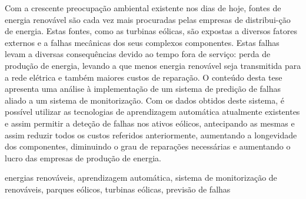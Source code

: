 


Com a crescente preocupação ambiental existente nos dias de hoje, fontes de energia renovável são cada vez mais procuradas pelas empresas de distribui-ção de energia. Estas fontes, como as turbinas eólicas, são expostas a diversos fatores externos e a falhas mecânicas dos seus complexos componentes. Estas falhas levam a diversas consequências devido ao tempo fora de serviço: perda de produção de energia, levando a que menos energia renovável seja transmitida para a rede elétrica e também maiores custos de reparação. O conteúdo desta tese apresenta uma análise à implementação de um sistema de predição de falhas aliado a um sistema de monitorização. Com os dados obtidos deste sistema, é possível utilizar as tecnologias de aprendizagem automática atualmente existentes e assim permitir a deteção de falhas nos ativos eólicos, antecipando as mesmas e assim reduzir todos os custos referidos anteriormente, aumentando a longevidade dos componentes, diminuindo o grau de reparações necessárias e aumentando o lucro das empresas de produção de energia.

\begin{keywords}
energias renováveis, aprendizagem automática, sistema de monitorização de renováveis, parques eólicos, turbinas eólicas, previsão de falhas
\end{keywords}

